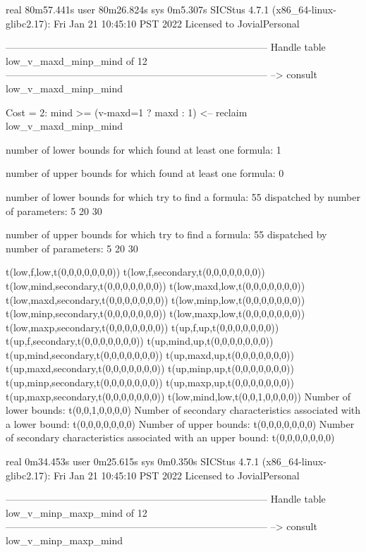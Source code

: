 real	80m57.441s
user	80m26.824s
sys	0m5.307s
SICStus 4.7.1 (x86_64-linux-glibc2.17): Fri Jan 21 10:45:10 PST 2022
Licensed to JovialPersonal


--------------------------------------------------------------------------------
Handle table low_v_maxd_minp_mind of 12
--------------------------------------------------------------------------------
--> consult low_v_maxd_minp_mind

Cost =  2:  mind >= (v-maxd=1 ? maxd : 1)
<-- reclaim low_v_maxd_minp_mind

number of lower bounds for which found at least one formula: 1

number of upper bounds for which found at least one formula: 0

number of lower bounds for which try to find a formula: 55
dispatched by number of parameters: 5  20  30

number of upper bounds for which try to find a formula: 55
dispatched by number of parameters: 5  20  30

t(low,f,low,t(0,0,0,0,0,0,0))
t(low,f,secondary,t(0,0,0,0,0,0,0))
t(low,mind,secondary,t(0,0,0,0,0,0,0))
t(low,maxd,low,t(0,0,0,0,0,0,0))
t(low,maxd,secondary,t(0,0,0,0,0,0,0))
t(low,minp,low,t(0,0,0,0,0,0,0))
t(low,minp,secondary,t(0,0,0,0,0,0,0))
t(low,maxp,low,t(0,0,0,0,0,0,0))
t(low,maxp,secondary,t(0,0,0,0,0,0,0))
t(up,f,up,t(0,0,0,0,0,0,0))
t(up,f,secondary,t(0,0,0,0,0,0,0))
t(up,mind,up,t(0,0,0,0,0,0,0))
t(up,mind,secondary,t(0,0,0,0,0,0,0))
t(up,maxd,up,t(0,0,0,0,0,0,0))
t(up,maxd,secondary,t(0,0,0,0,0,0,0))
t(up,minp,up,t(0,0,0,0,0,0,0))
t(up,minp,secondary,t(0,0,0,0,0,0,0))
t(up,maxp,up,t(0,0,0,0,0,0,0))
t(up,maxp,secondary,t(0,0,0,0,0,0,0))
t(low,mind,low,t(0,0,1,0,0,0,0))
Number of lower bounds:                                             t(0,0,1,0,0,0,0)
Number of secondary characteristics associated with a lower bound:  t(0,0,0,0,0,0,0)
Number of upper bounds:                                             t(0,0,0,0,0,0,0)
Number of secondary characteristics associated with an upper bound: t(0,0,0,0,0,0,0)

real	0m34.453s
user	0m25.615s
sys	0m0.350s
SICStus 4.7.1 (x86_64-linux-glibc2.17): Fri Jan 21 10:45:10 PST 2022
Licensed to JovialPersonal


--------------------------------------------------------------------------------
Handle table low_v_minp_maxp_mind of 12
--------------------------------------------------------------------------------
--> consult low_v_minp_maxp_mind

